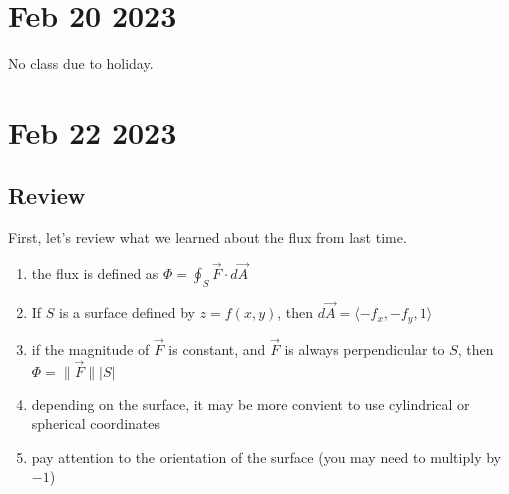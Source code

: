 \documentclass[11pt]{article}
\begin{document}
      \section{Feb 20 2023}
      No class due to holiday.
      \section{Feb 22 2023}
      \subsection{Review}
      First, let's review what we learned about the flux from last time.
      \begin{enumerate}
        \item the flux is defined as $\Phi = \oint_{S} \vec{F} \cdot d\vec{A}$
        \item If $S$ is a surface defined by $z = f(x,y)$, then $d\vec{A} =
              \langle -f_{x}, -f_{y}, 1 \rangle $
        \item if the magnitude of $\vec{F}$ is constant, and $\vec{F}$ is
              always perpendicular to $S$, then $\Phi = \|\vec{F}\||S| $
              \item depending on the surface, it may be more convient to use cylindrical or spherical coordinates
              \item pay attention to the orientation of the surface (you may need to multiply by $-1$)
      \end{enumerate}
\end{document}
